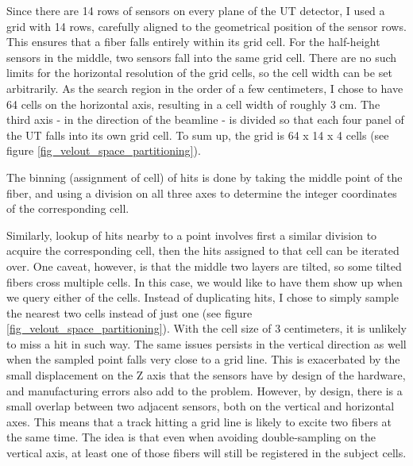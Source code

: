 \documentclass[12pt]{article}
\begin{document}
Since there are 14  rows of sensors on every plane of the UT detector, I used a grid with 14 rows, carefully aligned to the geometrical position of the sensor rows. This ensures that a fiber falls entirely within its grid cell. For the half-height sensors in the middle, two sensors fall into the same grid cell. There are no such limits for the horizontal resolution of the grid cells, so the cell width can be set arbitrarily. As the search region in the order of a few centimeters, I chose to have 64 cells on the horizontal axis, resulting in a cell width of roughly 3 cm. The third axis - in the direction of the beamline - is divided so that each four panel of the UT falls into its own grid cell. To sum up, the grid is 64 x 14 x 4 cells (see figure \ref{fig_velout_space_partitioning}).

The binning (assignment of cell) of hits is done by taking the middle point of the fiber, and using a division on all three axes to determine the integer coordinates of the corresponding cell.

Similarly, lookup of hits nearby to a point involves first a similar division to acquire the corresponding cell, then the hits assigned to that cell can be iterated over. One caveat, however, is that the middle two layers are tilted, so some tilted fibers cross multiple cells. In this case, we would like to have them show up when we query either of the cells. Instead of duplicating hits, I chose to simply sample the nearest two cells instead of just one (see figure \ref{fig_velout_space_partitioning}). With the cell size of 3 centimeters, it is unlikely to miss a hit in such way. The same issues persists in the vertical direction as well when the sampled point falls very close to a grid line. This is exacerbated by the small displacement on the Z axis that the sensors have by design of the hardware, and manufacturing errors also add to the problem. However, by design, there is a small overlap between two adjacent sensors, both on the vertical and horizontal axes. This means that a track hitting a grid line is likely to excite two fibers at the same time. The idea is that even when avoiding double-sampling on the vertical axis, at least one of those fibers will still be registered in the subject cells.
\end{document}

